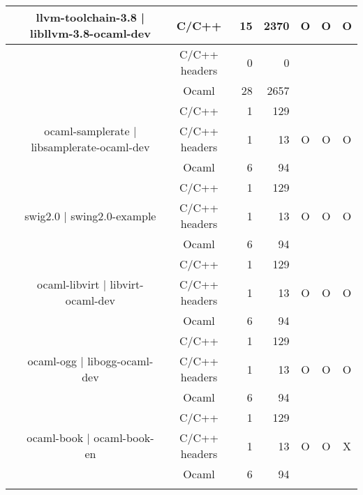 \documentclass[11pt,a4paper]{article}
\begin{document}
\begin{table}[h,t]
\begin{tabular}{|>{\centering}m{3cm}| c|c|r|r| c| c|c|}
 &\multirow{3}{3cm}{llvm-toolchain-3.8 | libllvm-3.8-ocaml-dev} & C/C++ & 15 & 2370 & \multirow{3}{*}{O} & \multirow{3}{*}{O} & \multirow{3}{*}{O}\\
 \cline{3-5}
 & &                           C/C++ headers & 0 & 0 & & & \\
 \cline{3-5}
 & &                          Ocaml & 28 & 2657 & & & \\
 \cline{2-8}

 &\multirow{3}{3cm}{ocaml-samplerate | libsamplerate-ocaml-dev} & C/C++ & 1 & 129 & \multirow{3}{*}{O} & \multirow{3}{*}{O} & \multirow{3}{*}{O}\\
\cline{3-5}
& &                           C/C++ headers & 1 & 13 & & & \\
\cline{3-5}
& &                          Ocaml & 6 & 94 & & & \\
\cline{2-8}





 &\multirow{3}{3cm}{swig2.0 | swing2.0-example} & C/C++ & 1 & 129 & \multirow{3}{*}{O} & \multirow{3}{*}{O} & \multirow{3}{*}{O}\\
\cline{3-5}
& &                           C/C++ headers & 1 & 13 & & & \\
\cline{3-5}
& &                          Ocaml & 6 & 94 & & & \\
\cline{2-8}


 &\multirow{3}{3cm}{ocaml-libvirt | libvirt-ocaml-dev} & C/C++ & 1 & 129 & \multirow{3}{*}{O} & \multirow{3}{*}{O} & \multirow{3}{*}{O}\\
\cline{3-5}
& &                           C/C++ headers & 1 & 13 & & & \\
\cline{3-5}
& &                          Ocaml & 6 & 94 & & & \\
\cline{2-8}


 &\multirow{3}{3cm}{ocaml-ogg | libogg-ocaml-dev} & C/C++ & 1 & 129 & \multirow{3}{*}{O} & \multirow{3}{*}{O} & \multirow{3}{*}{O}\\
\cline{3-5}
& &                           C/C++ headers & 1 & 13 & & & \\
\cline{3-5}
& &                          Ocaml & 6 & 94 & & & \\
\cline{2-8}

 &\multirow{3}{3cm}{ocaml-book | ocaml-book-en} & C/C++ & 1 & 129 & \multirow{3}{*}{O} & \multirow{3}{*}{O} & \multirow{3}{*}{X}\\
\cline{3-5}
& &                           C/C++ headers & 1 & 13 & & & \\
\cline{3-5}
& &                          Ocaml & 6 & 94 & & & \\
\cline{2-8}



\end{tabular}
\end{table}
\end{document}
